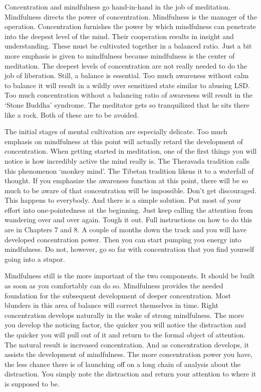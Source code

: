 Concentration and mindfulness go hand-in-hand in the job of meditation.
Mindfulness directs the power of concentration.  Mindfulness is the manager of
the operation. Concentration furnishes the power by which mindfulness can
penetrate into the deepest level of the mind. Their cooperation results in
insight and understanding. These must be cultivated together in a balanced
ratio. Just a bit more emphasis is given to mindfulness because mindfulness is
the center of meditation. The deepest levels of concentration are not really
needed to do the job of liberation. Still, a balance is essential. Too much
awareness without calm to balance it will result in a wildly over sensitized
state similar to abusing LSD. Too much concentration without a balancing ratio
of awareness will result in the `Stone Buddha' syndrome. The meditator gets so
tranquilized that he sits there like a rock. Both of these are to be avoided.

The initial stages of mental cultivation are especially delicate. Too much
emphasis on mindfulness at this point will actually retard the development of
concentration. When getting started in meditation, one of the first things you
will notice is how incredibly active the mind really is. The Theravada tradition
calls this phenomenon `monkey mind'. The Tibetan tradition likens it to a
waterfall of thought. If you emphasize the awareness function at this point,
there will be so much to be aware of that concentration will be impossible.
Don't get discouraged. This happens to everybody. And there is a simple
solution. Put most of your effort into one-pointedness at the beginning. Just
keep calling the attention from wandering over and over again. Tough it out.
Full instructions on how to do this are in Chapters 7 and 8. A couple of months
down the track and you will have developed concentration power. Then you can
start pumping you energy into mindfulness. Do not, however, go so far with
concentration that you find yourself going into a stupor.

Mindfulness still is the more important of the two components. It should be
built as soon as you comfortably can do so.  Mindfulness provides the needed
foundation for the subsequent development of deeper concentration. Most blunders
in this area of balance will correct themselves in time. Right concentration
develops naturally in the wake of strong mindfulness. The more you develop the
noticing factor, the quicker you will notice the distraction and the quicker you
will pull out of it and return to the formal object of attention. The natural
result is increased concentration. And as concentration develops, it assists the
development of mindfulness. The more concentration power you have, the less
chance there is of launching off on a long chain of analysis about the
distraction. You simply note the distraction and return your attention to where
it is supposed to be.

